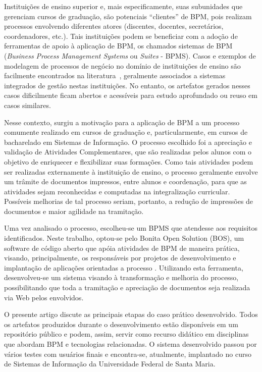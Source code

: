\documentclass[12pt]{article}
\begin{document}
Instituições de ensino superior e, mais especificamente, suas subunidades que gerenciam cursos de graduação, são potenciais “clientes” de BPM, pois realizam processos envolvendo diferentes atores (discentes, docentes, secretários, coordenadores, etc.). Tais instituições podem se beneficiar com a adoção de ferramentas de apoio à aplicação de BPM, os chamados sistemas de BPM (\emph{Business Process Management Systems} ou \emph{Suites} - BPMS). Casos e exemplos de modelagem de processos de negócio no domínio de instituições de ensino são facilmente encontrados na literatura~\cite{JestonNelis2012}, geralmente associados a sistemas integrados de gestão nestas instituições. No entanto, os artefatos gerados nesses casos dificilmente ficam abertos e acessíveis para estudo aprofundado ou reuso em casos similares. 

Nesse contexto, surgiu a motivação para a aplicação de BPM a um processo comumente realizado em cursos de graduação e, particularmente, em cursos de bacharelado em Sistemas de Informação. 
O processo escolhido foi a apreciação e validação de Atividades Complementares, que são realizadas pelos alunos com o objetivo de enriquecer e flexibilizar suas formações. Como tais atividades podem ser realizadas externamente à instituição de ensino, o processo geralmente envolve um trâmite de documentos impressos, entre alunos e coordenação, para que as atividades sejam reconhecidas e computadas na integralização curricular. Possíveis melhorias de tal processo seriam, portanto, a redução de impressões de documentos e maior agilidade na tramitação.

Uma vez analisado o processo, escolheu-se um BPMS que atendesse aos requisitos identificados. Neste trabalho, optou-se pelo Bonita Open Solution (BOS), um software de código aberto que apóia atividades de BPM de maneira  prática, visando, principalmente, os responsáveis  por projetos de desenvolvimento e implantação de aplicações orientadas a processo \cite{BONITASOFT}. Utilizando esta ferramenta, desenvolveu-se um sistema visando à transformação e melhoria do processo, possibilitando que toda a tramitação e apreciação de documentos seja realizada via Web pelos envolvidos.

O presente artigo discute as principais etapas do caso prático desenvolvido. Todos os artefatos produzidos durante o desenvolvimento estão disponíveis em um repositório público e podem, assim, servir como recurso didático em disciplinas que abordam BPM e tecnologias relacionadas. O sistema desenvolvido passou por vários testes com usuários finais e encontra-se, atualmente, implantado no curso de Sistemas de Informação da Universidade Federal de Santa Maria.
\end{document}
